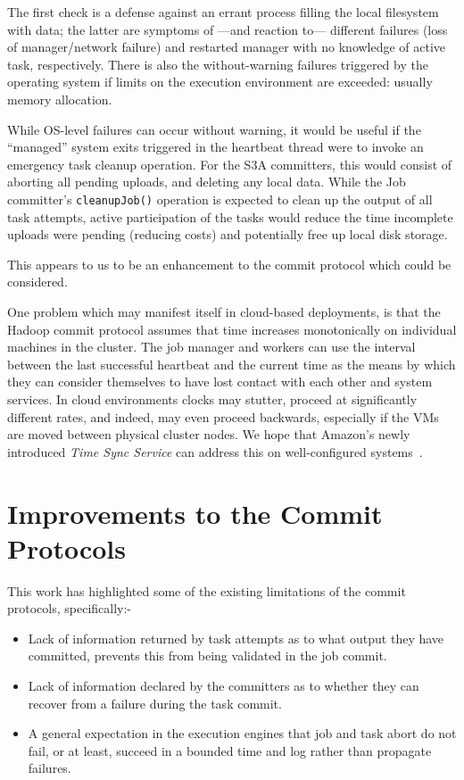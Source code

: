 \documentclass[conference]{IEEEtran}
\begin{document}
The first check is a defense against an errant process filling the local
filesystem with data;
the latter are symptoms of ---and reaction to--- different failures (loss of manager/network failure)
and restarted manager with no knowledge of active task, respectively.
There is also the without-warning failures triggered by the operating system
if limits on the execution environment are exceeded: usually memory allocation.

While OS-level failures can occur without warning, it would be useful if the
``managed'' system exits triggered in the heartbeat thread were to invoke
an emergency task cleanup operation.
For the S3A committers, this would consist of aborting all pending uploads, and
deleting any local data.
While the Job committer's \texttt{cleanupJob()} operation is expected to clean up
the output of all task attempts, active participation of the tasks would
reduce the time incomplete uploads were pending (reducing costs) and
potentially free up local disk storage.

This appears to us to be an enhancement to the commit protocol which could
be considered.


One problem which may manifest itself in cloud-based deployments,
is that the Hadoop commit protocol assumes that time increases monotonically
on individual machines in the cluster.
The job manager and workers can use the interval between the last successful heartbeat
and the current time as the means by which they can consider themselves to have lost
contact with each other and system services.
In cloud environments clocks may stutter, proceed at significantly different rates,
and indeed, may even proceed backwards, especially if the VMs are moved between
physical cluster nodes.
We hope that Amazon's newly introduced \emph{Time Sync Service}
can address this on well-configured systems\ \cite{AWS-clock-service}.



\section{Improvements to the Commit Protocols}
\label{sec:improvements-to-commit-protocols}


This work has highlighted some of the existing limitations of the commit protocols,
specifically:-

\begin{itemize}
  \item Lack of information returned by task attempts as to what output they have committed,
  prevents this from being validated in the job commit.
  \item Lack of information declared by the committers as to whether they can
  recover from a failure during the task commit.
  \item A general expectation in the execution engines that job and task abort do
  not fail, or at least, succeed in a bounded time and log rather than propagate
  failures.
\end{itemize}
\end{document}
